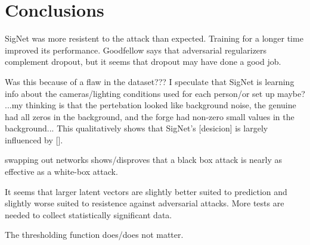 \section{Conclusions}\label{sec:conclusion}

SigNet was more resistent to the attack than expected.
Training for a longer time improved its performance.
Goodfellow says that adversarial regularizers complement dropout, but it seems that dropout may have done a good job.

Was this because of a flaw in the dataset???
I speculate that SigNet is learning info about the cameras/lighting conditions used for each person/or set up maybe?
...my thinking is that the pertebation looked like background noise, the genuine had all zeros in the background, and the forge had non-zero small values in the background...
This qualitatively shows that SigNet's [desicion] is largely influenced by [].

swapping out networks shows/disproves that a black box attack is nearly as effective as a white-box attack.

It seems that larger latent vectors are slightly better suited to prediction and slightly worse suited to resistence against adversarial attacks.
More tests are needed to collect statistically significant data.

The thresholding function does/does not matter.

